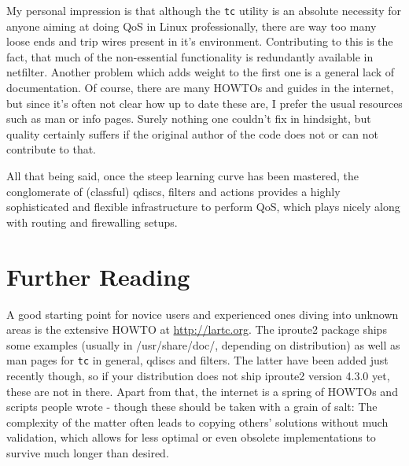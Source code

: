 \documentclass[12pt,twoside]{article}
\newcommand{\cmd}{\texttt}
\begin{document}
My personal impression is that although the \cmd{tc} utility is an absolute
necessity for anyone aiming at doing QoS in Linux professionally, there are way
too many loose ends and trip wires present in it's environment. Contributing to
this is the fact, that much of the non-essential functionality is redundantly
available in netfilter. Another problem which adds weight to the first one is a
general lack of documentation. Of course, there are many HOWTOs and guides in
the internet, but since it's often not clear how up to date these are, I prefer
the usual resources such as man or info pages. Surely nothing one couldn't fix
in hindsight, but quality certainly suffers if the original author of the code
does not or can not contribute to that.

All that being said, once the steep learning curve has been mastered, the
conglomerate of (classful) qdiscs, filters and actions provides a highly
sophisticated and flexible infrastructure to perform QoS, which plays nicely
along with routing and firewalling setups.


\section*{Further Reading}

A good starting point for novice users and experienced ones diving into unknown
areas is the extensive HOWTO at \url{http://lartc.org}. The iproute2 package ships
some examples (usually in /usr/share/doc/, depending on distribution) as well as
man pages for \cmd{tc} in general, qdiscs and filters. The latter have been added
just recently though, so if your distribution does not ship iproute2 version
4.3.0 yet, these are not in there. Apart from that, the internet is a spring of
HOWTOs and scripts people wrote - though these should be taken with a grain of
salt: The complexity of the matter often leads to copying others' solutions
without much validation, which allows for less optimal or even obsolete
implementations to survive much longer than desired.
\end{document}
